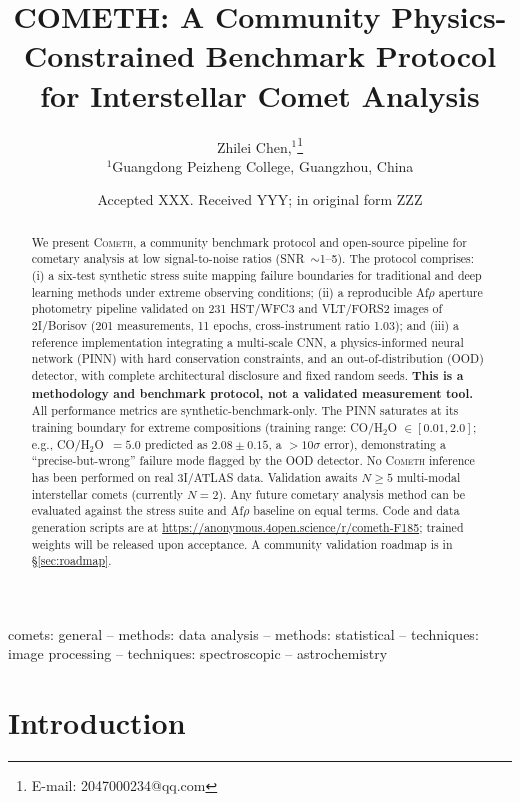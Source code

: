 \documentclass[usenatbib]{mnras}
\begin{document}
\title[COMETH: A Community Benchmark Protocol]{COMETH: A Community Physics-Constrained Benchmark Protocol for Interstellar Comet Analysis}

\author[Chen]{
Zhilei Chen,$^{1}$\thanks{E-mail: 2047000234@qq.com}
\\
$^{1}$Guangdong Peizheng College, Guangzhou, China
}

\date{Accepted XXX. Received YYY; in original form ZZZ}

\begin{abstract}
We present \textsc{Cometh}, a community benchmark protocol and open-source pipeline for cometary analysis at low signal-to-noise ratios (SNR~$\sim$1--5). The protocol comprises: (i) a six-test synthetic stress suite mapping failure boundaries for traditional and deep learning methods under extreme observing conditions; (ii) a reproducible Af$\rho$ aperture photometry pipeline validated on 231 HST/WFC3 and VLT/FORS2 images of 2I/Borisov (201 measurements, 11 epochs, cross-instrument ratio 1.03); and (iii) a reference implementation integrating a multi-scale CNN, a physics-informed neural network (PINN) with hard conservation constraints, and an out-of-distribution (OOD) detector, with complete architectural disclosure and fixed random seeds. \textbf{This is a methodology and benchmark protocol, not a validated measurement tool.} All performance metrics are synthetic-benchmark-only. The PINN saturates at its training boundary for extreme compositions (training range: CO/H$_2$O $\in [0.01, 2.0]$; e.g., CO/H$_2$O~$=5.0$ predicted as $2.08\pm0.15$, a $>10\sigma$ error), demonstrating a ``precise-but-wrong'' failure mode flagged by the OOD detector. No \textsc{Cometh} inference has been performed on real 3I/ATLAS data. Validation awaits $N \geq 5$ multi-modal interstellar comets (currently $N=2$). Any future cometary analysis method can be evaluated against the stress suite and Af$\rho$ baseline on equal terms. Code and data generation scripts are at \url{https://anonymous.4open.science/r/cometh-F185}; trained weights will be released upon acceptance. A community validation roadmap is in \S\ref{sec:roadmap}.
\end{abstract}

\begin{keywords}
comets: general -- methods: data analysis -- methods: statistical -- techniques: image processing -- techniques: spectroscopic -- astrochemistry
\end{keywords}

\section{Introduction}\label{sec:intro}
\end{document}
